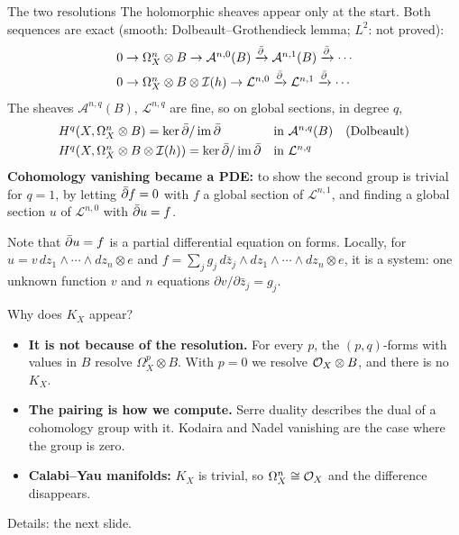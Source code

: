 \begin{frame}{The two resolutions}
\label{fr:l2-kernel}
The holomorphic sheaves appear only at the start. Both sequences are exact (smooth: Dolbeault--Grothendieck lemma; \(L^2\): not proved):
\[
\begin{array}{l}
0\to\Omega^n_X\otimes B\to\mathcal A^{n,0}(B)\xrightarrow{\bar\partial}\mathcal A^{n,1}(B)\xrightarrow{\bar\partial}\cdots\\[3pt]
0\to\Omega^n_X\otimes B\otimes\mathcal I(h)\to\mathcal L^{n,0}\xrightarrow{\bar\partial}\mathcal L^{n,1}\xrightarrow{\bar\partial}\cdots
\end{array}
\]
The sheaves \(\mathcal A^{n,q}(B)\), \(\mathcal L^{n,q}\) are fine, so on global sections, in degree \(q\),
\[
\begin{array}{ll}
H^q(X,\Omega^n_X\otimes B)=\ker\bar\partial/\operatorname{im}\bar\partial&\text{in }\mathcal A^{n,q}(B)\quad\text{(Dolbeault)}\\[3pt]
H^q(X,\Omega^n_X\otimes B\otimes\mathcal I(h))=\ker\bar\partial/\operatorname{im}\bar\partial&\text{in }\mathcal L^{n,q}
\end{array}
\]
\textbf{Cohomology vanishing became a PDE:} to show the second group is trivial for \(q=1\), by letting \(\bar\partial f=0\) with \(f\) a global section of \(\mathcal L^{n,1}\), and finding a global section \(u\) of \(\mathcal L^{n,0}\) with \(\bar\partial u=f\).
\par\smallskip
Note that \(\bar\partial u=f\) is a partial differential equation on forms. Locally, for \(u=v\,dz_1\wedge\cdots\wedge dz_n\otimes e\) and \(f=\sum_jg_j\,d\bar z_j\wedge dz_1\wedge\cdots\wedge dz_n\otimes e\), it is a system: one unknown function \(v\) and \(n\) equations \(\partial v/\partial\bar z_j=g_j\).
\end{frame}

\begin{frame}{Why does \(K_X\) appear?}
\label{fr:why-nq}
\label{fr:KX-summary}
\begin{center}
\end{center}
\begin{itemize}
\setlength{\itemsep}{12pt}
\item \textbf{It is not because of the resolution.} For every \(p\), the \((p,q)\)-forms with values in \(B\) resolve \(\Omega^p_X\otimes B\). With \(p=0\) we resolve \(\mathcal O_X\otimes B\), and there is no \(K_X\).
\item \textbf{The pairing is how we compute.} Serre duality describes the dual of a cohomology group with it. Kodaira and Nadel vanishing are the case where the group is zero.
\item \textbf{Calabi--Yau manifolds:} \(K_X\) is trivial, so \(\Omega^n_X\cong\mathcal O_X\) and the difference disappears.
\end{itemize}
\par\medskip
Details: the next slide.
\end{frame}


